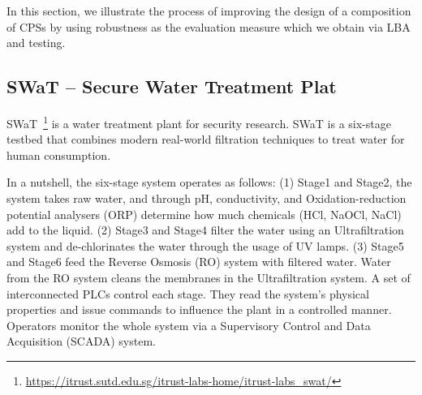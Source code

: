 {{%
In this section, we illustrate the process of improving the design of a composition of CPSs by using robustness as the evaluation measure which we obtain via LBA and testing.
\subsection{SWaT -- Secure Water Treatment Plat}

{\color{red}SWaT~\cite{SWat}\footnote{\url{https://itrust.sutd.edu.sg/itrust-labs-home/itrust-labs_swat/}}
is a water treatment plant for security research. SWaT is a six-stage testbed that combines modern real-world filtration techniques to treat water for human consumption.}

In a nutshell, the six-stage system operates as follows:
(1) Stage1 and Stage2, the system takes raw water, and through pH, conductivity, and Oxidation-reduction potential analysers (ORP) determine how much chemicals (HCl, NaOCl, NaCl) add to the liquid. 
(2) Stage3 and Stage4 filter the water using an Ultrafiltration system and de-chlorinates the water through the usage of UV lamps. 
(3) Stage5 and Stage6 feed the Reverse Osmosis (RO) system with filtered water. Water from the RO system cleans the membranes in the Ultrafiltration system. 
A set of interconnected PLCs control each stage. 
They read the system's physical properties and issue commands to influence the plant in a controlled manner. 
Operators monitor the whole system via a Supervisory Control and Data Acquisition (SCADA) system.

}}
